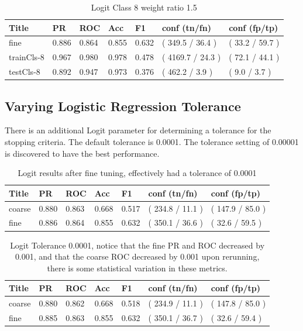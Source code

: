 \documentclass[ms]{nuthesis}
\begin{document}
\FloatBarrier
\begin{table}[H]
\centering
\caption{Logit Class 8 weight ratio 1.5}
\label{tab:LogRegCls8-Wt1p5}
\begin{tabular}{|l||l||l||l||l||l||l|}\toprule
Title & PR & ROC & Acc & F1 & conf (tn/fn) & conf (fp/tp) \\ \midrule
fine & 0.886 & 0.864 & 0.855 & 0.632 & ( 349.5 / 36.4 ) & ( 33.2 / 59.7 ) \\
trainCls-8 & 0.967 & 0.980 & 0.978 & 0.478 & ( 4169.7 / 24.3 ) & ( 72.1 / 44.1 ) \\
testCls-8 & 0.892 & 0.947 & 0.973 & 0.376 & ( 462.2 / 3.9 ) & ( 9.0 / 3.7 ) \\ \bottomrule
\end{tabular}
\end{table}
\FloatBarrier

\subsection{Varying Logistic Regression Tolerance}
\par There is an additional Logit parameter for determining a tolerance for the
stopping criteria. The default tolerance is 0.0001. The tolerance setting of
0.00001 is discovered to have the best performance.

\FloatBarrier
\begin{table}[H]
\centering
\caption{Logit results after fine tuning, effectively had a tolerance of 0.0001}
\label{tab:LogRegAftFineTune}
\begin{tabular}{|l||l||l||l||l||l||l|}\toprule
Title & PR & ROC & Acc & F1 & conf (tn/fn) & conf (fp/tp) \\ \midrule
coarse & 0.880 & 0.863 & 0.668 & 0.517 & ( 234.8 / 11.1 ) & ( 147.9 / 85.0 ) \\
fine & 0.886 & 0.864 & 0.855 & 0.632 & ( 350.1 / 36.6 ) & ( 32.6 / 59.5 ) \\ \bottomrule
\end{tabular}
\end{table}
\FloatBarrier


\FloatBarrier
\begin{table}[H]
\centering
\caption{Logit Tolerance 0.0001, notice that the fine PR and ROC decreased by 0.001, and that the
coarse ROC decreased by 0.001 upon rerunning, there is some statistical variation in these metrics.}
\label{tab:LogRegOrig-0001}
\begin{tabular}{|l||l||l||l||l||l||l|}\toprule
Title & PR & ROC & Acc & F1 & conf (tn/fn) & conf (fp/tp) \\ \midrule
coarse & 0.880 & 0.862 & 0.668 & 0.518 & ( 234.9 / 11.1 ) & ( 147.8 / 85.0 ) \\
fine & 0.885 & 0.863 & 0.855 & 0.632 & ( 350.1 / 36.7 ) & ( 32.6 / 59.4 ) \\ \bottomrule
\end{tabular}
\end{table}
\FloatBarrier
\end{document}
